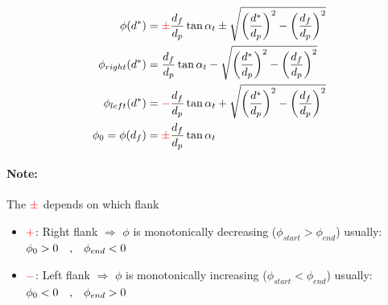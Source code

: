 \begin{align}
    \phi(d^*)           &= \textcolor{red}{\pm}\frac{d_f}{d_p}\tan{\alpha_t} \pm \sqrt{\left(\frac{d^*}{d_p}\right)^2- \left(\frac{d_f}{d_p}\right)^2} \\
    \phi_{right}(d^*)   &= \frac{d_f}{d_p}\tan{\alpha_t} - \sqrt{\left(\frac{d^*}{d_p}\right)^2 - \left(\frac{d_f}{d_p}\right)^2} \\
    \phi_{left}(d^*)    &= \textcolor{red}{-}\frac{d_f}{d_p}\tan{\alpha_t}
                            +\sqrt{\left(\frac{d^*}{d_p}\right)^2 -\left(\frac{d_f}{d_p}\right)^2} \\
    \phi_0 = \phi(d_f)  &= \textcolor{red}{\pm}\frac{d_f}{d_p}\tan{\alpha_t}
\end{align}

\paragraph{Note:} The $\textcolor{red}{\pm}$ depends on which flank
\begin{itemize}
    \item $\textcolor{red}{+}$: Right flank $\Rightarrow$ $\phi$ is monotonically decreasing ($\phi_{start} > \phi_{end}$)\newline
        usually: $\phi_0 > 0 \qq{,} \phi_{end} < 0$ 
    \item $\textcolor{red}{-}$: Left flank $\Rightarrow$ $\phi$ is monotonically increasing ($\phi_{start} < \phi_{end}$)\newline
        usually: $\phi_0 < 0 \qq{,} \phi_{end} > 0$ 
\end{itemize}
